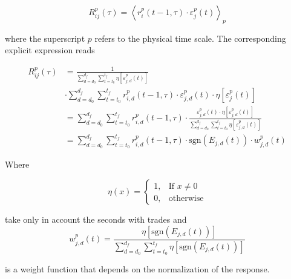 \begin{equation}\label{eq:response_functions_time_scale_general}
    R^{p}_{ij}\left(\tau\right)=\left\langle r^{p}_{i}\left(t-1, \tau\right)
    \cdot\varepsilon_{j}^{p} \left(t\right)
    \right\rangle _{p}
\end{equation}

where the superscript $p$ refers to the physical time scale. The corresponding
explicit expression reads

\begin{align}\label{eq:response_seconds_explicit}
    R_{ij}^{p}\left(\tau\right)&=\frac{1}{\sum_{d=d_{0}}^{d_{f}}
    \sum_{t=t_{0}}^{t_{f}} \eta\left[ \varepsilon_{j,d}^{p}
    \left(t\right)\right]} \nonumber \\
    &\cdot\sum_{d=d_{0}}^{d_{f}} \sum_{t=t_{0}}^{t_{f}}
    r^{p}_{i,d}\left(t-1,\tau\right) \cdot\varepsilon_{j,d}^{p}\left(t\right)
    \cdot\eta\left[\varepsilon_{j}^{p} \left(t\right)\right] \\
    &=\sum_{d=d_{0}}^{d_{f}}\sum_{t=t_{0}}^{t_{f}}r^{p}_{i,d}
    \left(t-1,\tau\right) \cdot\frac{\varepsilon_{j,d}^{p}\left(t\right)
    \cdot\eta\left[\varepsilon_{j,d}^{p} \left( t\right)\right]}
    {\sum_{d=d_{0}}^{d_{f}}\sum_{t=t_{0}}^{t_{f}}\eta
    \left[\varepsilon_{j,d}^{p} \left(t\right)\right]} \nonumber \\
    &=\sum_{d=d_{0}}^{d_{f}}\sum_{t=t_{0}}^{t_{f}}r^{p}_{i,d}
    \left(t-1,\tau\right) \cdot\text{sgn}\left(E_{j,d}\left(t\right)\right)
    \cdot w_{j,d}^{p}\left(t\right)
\end{align}

Where

\begin{equation}
    \eta\left(x\right)=\left\{ \begin{array}{cc}
    1, & \text{If }x\ne0 \\
    0, & \text{otherwise}
    \end{array}\right.
\end{equation}

take only in account the seconds with trades and
\begin{equation}
    w_{j,d}^{p}\left(t\right) = \frac{\eta\left[\text{sgn}
    \left(E_{j,d}\left( t\right)\right)\right]}{\sum_{d=d_{0}}^{d_{f}}
    \sum_{t=t_{0}}^{t_{f}} \eta\left[\text{sgn}\left(E_{j,d}
    \left(t\right)\right)\right]}
\end{equation}

is a weight function that depends on the normalization of the response.

